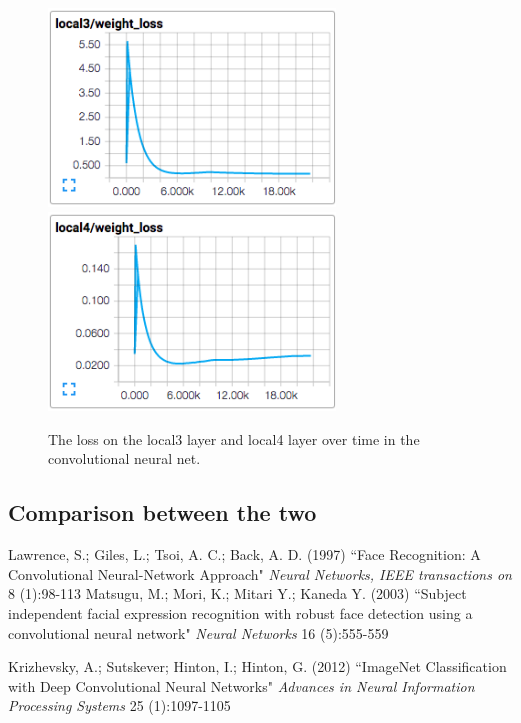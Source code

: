 \documentclass[11pt, twocolumn, twoside]{article}
\begin{document}
\begin{figure}
	\centering
	\includegraphics[width=3in]{local3_loss}
	\includegraphics[width=3in]{local4_loss}
	\caption{The loss on the local3 layer and local4 layer over time in the convolutional neural net.}
	\label{fig:layer_loss}
\end{figure}

\subsection{Comparison between the two}


\begin{thebibliography}{9}
Lawrence, S.; Giles, L.; Tsoi, A. C.; Back, A. D. (1997)
``Face Recognition: A Convolutional Neural-Network Approach"
\textit{Neural Networks, IEEE transactions on} 8 (1):98-113
Matsugu, M.; Mori, K.; Mitari Y.; Kaneda Y. (2003)
``Subject independent facial expression recognition with robust face detection using a convolutional neural network"
\textit{Neural Networks} 16 (5):555-559


Krizhevsky, A.; Sutskever; Hinton, I.; Hinton, G. (2012)
``ImageNet Classification with Deep Convolutional Neural Networks"
\textit{Advances in Neural Information Processing Systems} 25 (1):1097-1105
\end{thebibliography}
\end{document}
